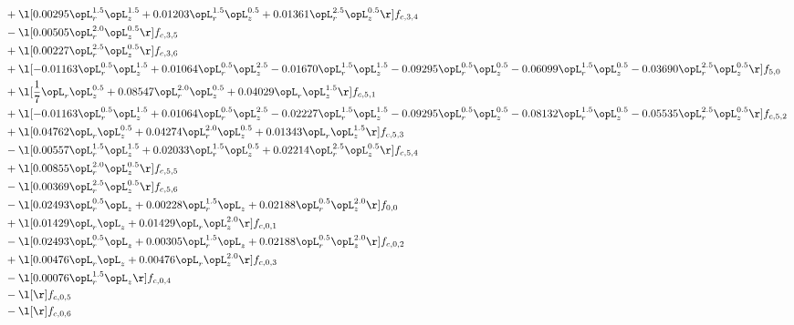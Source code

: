 \begin{alignat}{2}
& + \l[  0.00295 \opL_r^{1.5} \opL_z^{1.5} +  0.01203 \opL_r^{1.5} \opL_z^{0.5} +  0.01361 \opL_r^{2.5} \opL_z^{0.5}  \r] f_{c,3,4} \nonumber \\ 
& - \l[  0.00505 \opL_r^{2.0} \opL_z^{0.5}  \r] f_{c,3,5} \nonumber \\ 
& + \l[  0.00227 \opL_r^{2.5} \opL_z^{0.5}  \r] f_{c,3,6} \nonumber \\ 
& + \l[  -0.01163 \opL_r^{0.5} \opL_z^{1.5} +  0.01064 \opL_r^{0.5} \opL_z^{2.5}   -0.01670 \opL_r^{1.5} \opL_z^{1.5}   -0.09295 \opL_r^{0.5} \opL_z^{0.5}   -0.06099 \opL_r^{1.5} \opL_z^{0.5}   -0.03690 \opL_r^{2.5} \opL_z^{0.5}  \r] f_{5,0} \nonumber \\ 
& + \l[ \frac{1}{7} \opL_r \opL_z^{0.5} +  0.08547 \opL_r^{2.0} \opL_z^{0.5} +  0.04029 \opL_r \opL_z^{1.5}  \r] f_{c,5,1} \nonumber \\ 
& + \l[  -0.01163 \opL_r^{0.5} \opL_z^{1.5} +  0.01064 \opL_r^{0.5} \opL_z^{2.5}   -0.02227 \opL_r^{1.5} \opL_z^{1.5}   -0.09295 \opL_r^{0.5} \opL_z^{0.5}   -0.08132 \opL_r^{1.5} \opL_z^{0.5}   -0.05535 \opL_r^{2.5} \opL_z^{0.5}  \r] f_{c,5,2} \nonumber \\ 
& + \l[  0.04762 \opL_r \opL_z^{0.5} +  0.04274 \opL_r^{2.0} \opL_z^{0.5} +  0.01343 \opL_r \opL_z^{1.5}  \r] f_{c,5,3} \nonumber \\ 
& - \l[  0.00557 \opL_r^{1.5} \opL_z^{1.5} +  0.02033 \opL_r^{1.5} \opL_z^{0.5} +  0.02214 \opL_r^{2.5} \opL_z^{0.5}  \r] f_{c,5,4} \nonumber \\ 
& + \l[  0.00855 \opL_r^{2.0} \opL_z^{0.5}  \r] f_{c,5,5} \nonumber \\ 
& - \l[  0.00369 \opL_r^{2.5} \opL_z^{0.5}  \r] f_{c,5,6} \nonumber \\ 
& - \l[  0.02493 \opL_r^{0.5} \opL_z +  0.00228 \opL_r^{1.5} \opL_z +  0.02188 \opL_r^{0.5} \opL_z^{2.0}  \r] f_{0,0} \nonumber \\ 
& + \l[  0.01429 \opL_r \opL_z +  0.01429 \opL_r \opL_z^{2.0}  \r] f_{c,0,1} \nonumber \\ 
& - \l[  0.02493 \opL_r^{0.5} \opL_z +  0.00305 \opL_r^{1.5} \opL_z +  0.02188 \opL_r^{0.5} \opL_z^{2.0}  \r] f_{c,0,2} \nonumber \\ 
& + \l[  0.00476 \opL_r \opL_z +  0.00476 \opL_r \opL_z^{2.0}  \r] f_{c,0,3} \nonumber \\ 
& - \l[  0.00076 \opL_r^{1.5} \opL_z  \r] f_{c,0,4} \nonumber \\ 
& - \l[  \r] f_{c,0,5} \nonumber \\ 
& - \l[  \r] f_{c,0,6} \nonumber \\ 

\end{alignat}
